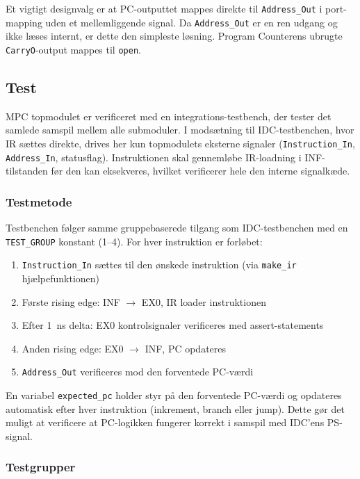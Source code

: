 \documentclass{article}
\begin{document}
\noindent Et vigtigt designvalg er at PC-outputtet mappes direkte til \texttt{Address\_Out} i port-mapping uden et mellemliggende signal. Da \texttt{Address\_Out} er en ren udgang og ikke læses internt, er dette den simpleste løsning. Program Counterens ubrugte \texttt{CarryO}-output mappes til \texttt{open}.

\subsection{Test}
\label{sec:mpc-test}

MPC topmodulet er verificeret med en integrations-testbench, der tester det samlede samspil mellem alle submoduler. I modsætning til IDC-testbenchen, hvor IR sættes direkte, drives her kun topmodulets eksterne signaler (\texttt{Instruction\_In}, \texttt{Address\_In}, statusflag). Instruktionen skal gennemløbe IR-loadning i INF-tilstanden før den kan eksekveres, hvilket verificerer hele den interne signalkæde.

\subsubsection{Testmetode}

Testbenchen følger samme gruppebaserede tilgang som IDC-testbenchen med en \texttt{TEST\_GROUP} konstant (1--4). For hver instruktion er forløbet:

\begin{enumerate}
    \item \texttt{Instruction\_In} sættes til den ønskede instruktion (via \texttt{make\_ir} hjælpefunktionen)
    \item Første rising edge: INF $\rightarrow$ EX0, IR loader instruktionen
    \item Efter 1~ns delta: EX0 kontrolsignaler verificeres med assert-statements
    \item Anden rising edge: EX0 $\rightarrow$ INF, PC opdateres
    \item \texttt{Address\_Out} verificeres mod den forventede PC-værdi
\end{enumerate}

\noindent En variabel \texttt{expected\_pc} holder styr på den forventede PC-værdi og opdateres automatisk efter hver instruktion (inkrement, branch eller jump). Dette gør det muligt at verificere at PC-logikken fungerer korrekt i samspil med IDC'ens PS-signal.

\subsubsection{Testgrupper}
\end{document}
